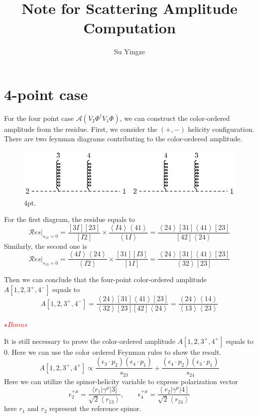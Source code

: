 \documentclass[12pt]{article}
\newcommand{\avg}[1]{\left\langle #1 \right\rangle}
\begin{document}
\title{Note for Scattering Amplitude Computation}
\author{Su Yingze}
\maketitle

\section{4-point case}
For the four point case $\mathcal{A}(V_2\Phi^\dagger V_1 \Phi )$, we can construct the color-ordered amplitude from the residue. First, we consider the $(+,-)$ helicity
configuration. There are two feynman diagrams contributing to the color-ordered amplitude.\\
\begin{figure}[htbp]
    \centering
    \includegraphics{4pt.eps}
    \caption{4pt.}
    \label{fig:myfigure}
\end{figure}

For the first diagram, the residue equals to
\begin{equation*}
    \mathcal{R}es|_{s_{12}=0}=\frac{[3 I ] [23]}{[I2]}\times \frac{\avg{I4}\avg{41}}{\avg{1I}}=\frac{\avg{24}[31]\avg{41}[23]}{[42]\avg{24}}
\end{equation*}
Similarly, the second one is
\begin{equation*}
    \mathcal{R}es|_{s_{13}=0}=\frac{\avg{4I}\avg{24}}{\avg{I2}}\times \frac{[31] [I3]}{[1I]}=\frac{\avg{24}[31]\avg{41}[23]}{\avg{32}[23]}
\end{equation*}

Then we can conclude that the four-point color-ordered amplitude $A[1,2,3^+,4^-]$ equals to
\begin{equation*}
    A[1,2,3^+,4^-]=\frac{\avg{24}[31]\avg{41}[23]}{\avg{32}[23][42]\avg{24}}=\frac{\avg{24}\avg{14}}{\avg{13}\avg{23}}
\end{equation*}

\textcolor{red}{$\star Bonus$}

It is still necessary to prove the color-ordered amplitude $A[1,2,3^+,4^+]$ equals to 0. Here we can use the color ordered Feynman rules to show the result.
\begin{equation*}
    A[1,2,3^+,4^+]\propto \frac{\left(\epsilon_3\cdot p_2\right)\left(\epsilon_4\cdot p_1\right)}{s_{23}}+\frac{\left(\epsilon_4\cdot p_2\right)\left(\epsilon_3\cdot p_1\right)}{s_{24}} 
\end{equation*}
Here we can utilize the spinor-helicity variable to express polarization vector
\begin{equation*}
    \epsilon_2^{+\mu}=\frac{\langle r_1 | \gamma^\mu | 3 ]}{\sqrt{2}\avg{r_13}},\qquad \epsilon_4^{+\mu}=\frac{\left <r_2|\gamma^\mu|4\right ]}{\sqrt{2}\avg{r_24}}
\end{equation*}
here $r_1$ and $r_2$ represent the reference spinor.
\end{document}
